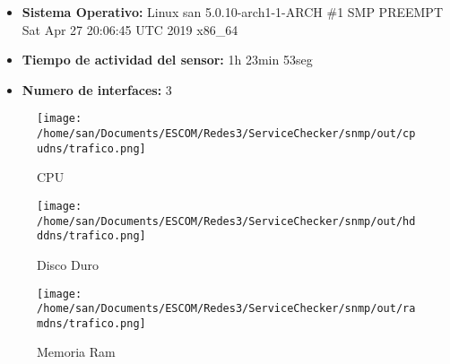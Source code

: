 \begin{itemize}
\item \textbf{Sistema Operativo:}  Linux san 5.0.10-arch1-1-ARCH \#1 SMP PREEMPT Sat Apr 27 20:06:45 UTC 2019 x86\_64
\item \textbf{Tiempo de actividad del sensor:} 1h 23min 53seg
\item \textbf{Numero de interfaces:} 3
\end{itemize}
\begin{figure}[!htb]
\texttt{[image: /home/san/Documents/ESCOM/Redes3/ServiceChecker/snmp/out/cpudns/trafico.png]}
\caption{CPU}
\endminipage\hfill
{}
\texttt{[image: /home/san/Documents/ESCOM/Redes3/ServiceChecker/snmp/out/hdddns/trafico.png]}
\caption{Disco Duro}
\endminipage\hfill
{}%
\texttt{[image: /home/san/Documents/ESCOM/Redes3/ServiceChecker/snmp/out/ramdns/trafico.png]}
\caption{Memoria Ram}
\endminipage
\end{figure}
\FloatBarrier
